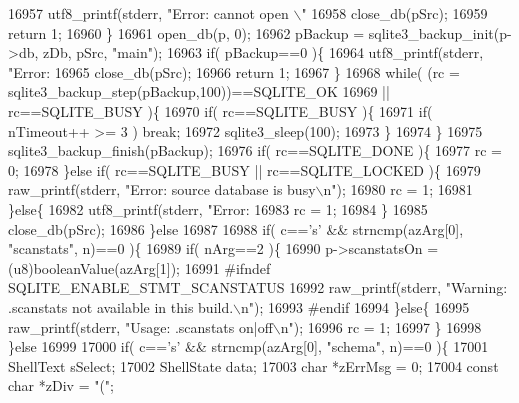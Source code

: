 \begin{DoxyCode}
{{{{{{{{{{{{{{{{{{{{{{{{{{{{{{{{{{{{{{{{{{{{{{{{{{{{{{{{{{{{{{{{{{{{{{{{{16957       utf8_printf(stderr, \textcolor{stringliteral}{"Error: cannot open \(\backslash\)"%
16958       close_db(pSrc);
16959       \textcolor{keywordflow}{return} 1;
16960     \}
16961     open_db(p, 0);
16962     pBackup = sqlite3_backup_init(p->db, zDb, pSrc, \textcolor{stringliteral}{"main"});
16963     \textcolor{keywordflow}{if}( pBackup==0 )\{
16964       utf8_printf(stderr, \textcolor{stringliteral}{"Error: %
16965       close_db(pSrc);
16966       \textcolor{keywordflow}{return} 1;
16967     \}
16968     \textcolor{keywordflow}{while}( (rc = sqlite3_backup_step(pBackup,100))==SQLITE_OK
16969           || rc==SQLITE_BUSY  )\{
16970       \textcolor{keywordflow}{if}( rc==SQLITE_BUSY )\{
16971         \textcolor{keywordflow}{if}( nTimeout++ >= 3 ) \textcolor{keywordflow}{break};
16972         sqlite3_sleep(100);
16973       \}
16974     \}
16975     sqlite3_backup_finish(pBackup);
16976     \textcolor{keywordflow}{if}( rc==SQLITE_DONE )\{
16977       rc = 0;
16978     \}\textcolor{keywordflow}{else} \textcolor{keywordflow}{if}( rc==SQLITE_BUSY || rc==SQLITE_LOCKED )\{
16979       raw_printf(stderr, \textcolor{stringliteral}{"Error: source database is busy\(\backslash\)n"});
16980       rc = 1;
16981     \}\textcolor{keywordflow}{else}\{
16982       utf8_printf(stderr, \textcolor{stringliteral}{"Error: %
16983       rc = 1;
16984     \}
16985     close_db(pSrc);
16986   \}\textcolor{keywordflow}{else}
16987 
16988   \textcolor{keywordflow}{if}( c==\textcolor{charliteral}{'s'} && strncmp(azArg[0], \textcolor{stringliteral}{"scanstats"}, n)==0 )\{
16989     \textcolor{keywordflow}{if}( nArg==2 )\{
16990       p->scanstatsOn = (u8)booleanValue(azArg[1]);
16991 \textcolor{preprocessor}{#ifndef SQLITE\_ENABLE\_STMT\_SCANSTATUS}
16992       raw_printf(stderr, \textcolor{stringliteral}{"Warning: .scanstats not available in this build.\(\backslash\)n"});
16993 \textcolor{preprocessor}{#endif}
16994     \}\textcolor{keywordflow}{else}\{
16995       raw_printf(stderr, \textcolor{stringliteral}{"Usage: .scanstats on|off\(\backslash\)n"});
16996       rc = 1;
16997     \}
16998   \}\textcolor{keywordflow}{else}
16999 
17000   \textcolor{keywordflow}{if}( c==\textcolor{charliteral}{'s'} && strncmp(azArg[0], \textcolor{stringliteral}{"schema"}, n)==0 )\{
17001     ShellText sSelect;
17002     ShellState data;
17003     \textcolor{keywordtype}{char} *zErrMsg = 0;
17004     \textcolor{keyword}{const} \textcolor{keywordtype}{char} *zDiv = \textcolor{stringliteral}{"("};
}}}}}}}}}}}}}}}}}}}}}}}}}}}}}}}}}}}}}}}}}}}}}}}}}}}}}}}}}}}}}}}}}}}}}}}}}}}}
\end{DoxyCode}
